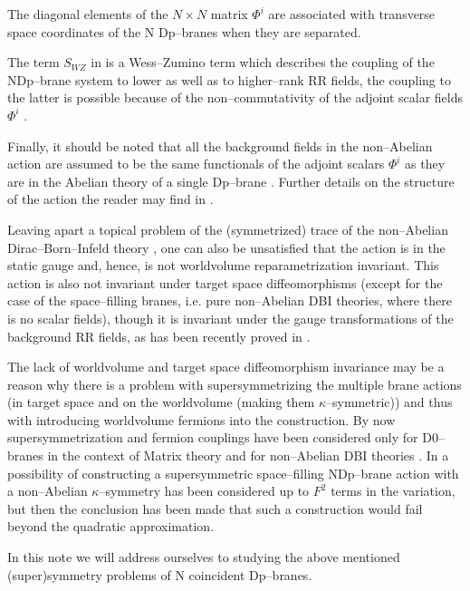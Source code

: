 \documentclass[a4paper,12pt]{article}
\begin{document}
The diagonal elements of the $N\times N$ matrix $\Phi^i$ are
associated with transverse space coordinates of the N Dp--branes
when they are separated.

The term $S_{WZ}$  in  is a Wess--Zumino term which describes
the coupling of the NDp--brane system to lower as well as to
higher--rank RR fields, the coupling to the latter is possible
because of the non--commutativity of the adjoint scalar fields
$\Phi^i$ \cite{Myers:1999ps,Taylor:2000pr}.

Finally, it should be noted that all the background fields in the
non--Abelian action  are assumed to be the same functionals
of the adjoint scalars $\Phi^i$ as they are in the Abelian theory
of a single Dp--brane \cite{douglas,hull}. Further details on the
structure of the action
 the reader may find in \cite{Myers:1999ps}.

Leaving apart a topical problem of the (symmetrized) trace of
the non--Abelian Dirac--Born--Infeld theory
\cite{Tseytlin:1997cs}, one can also be unsatisfied that the
action  is in the static gauge and, hence, is not worldvolume
reparametrization invariant. This action is also not invariant
under target space diffeomorphisms (except for the case of the
space--filling branes, i.e. pure non--Abelian DBI theories, where
there is no scalar fields), though it is invariant under the gauge
transformations of the background RR fields, as has been recently
proved in
\cite{ciocarlie}.

The lack of worldvolume and target space diffeomorphism invariance
may be a reason why there is a problem with supersymmetrizing the
multiple brane actions (in target space and on the worldvolume
(making them $\kappa$--symmetric)) and thus with introducing
worldvolume fermions into the construction. By now
supersymmetrization and fermion couplings have been considered
only for D0--branes in the context of Matrix theory
\cite{Taylor:2000pr} and for non--Abelian DBI theories
\cite{Ketov:2000fv,Bergshoeff:2001kt,Bergshoeff:2001dc}. In
\cite{Bergshoeff:2001kt} a possibility of constructing a
supersymmetric space--filling NDp--brane action with a
non--Abelian $\kappa$--symmetry has been considered up to $F^2$
terms in the variation, but then the conclusion has been made
\cite{Bergshoeff:2001dc} that such a construction would fail
beyond the quadratic approximation.

In this note we will address ourselves to studying the above
mentioned (super)symmetry problems of N coincident Dp--branes.
\end{document}
